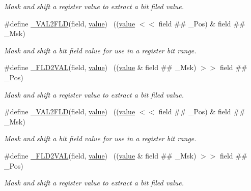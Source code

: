 \begin{DoxyCompactItemize}
\begin{DoxyCompactList}\small\item\em Mask and shift a register value to extract a bit filed value. \end{DoxyCompactList}\item 
\#define \hyperlink{group___c_m_s_i_s__core__bitfield_ga6d42abc96f2b99932a82deb035bd6935}{\+\_\+\+V\+A\+L2\+F\+LD}(field,  \hyperlink{semihosting_8h_aacce635d68067370c70caa2381ea1040}{value})    ~((\hyperlink{semihosting_8h_aacce635d68067370c70caa2381ea1040}{value} $<$$<$ field \#\# \+\_\+\+Pos) \& field \#\# \+\_\+\+Msk)
\begin{DoxyCompactList}\small\item\em Mask and shift a bit field value for use in a register bit range. \end{DoxyCompactList}\item 
\#define \hyperlink{group___c_m_s_i_s__core__bitfield_ga7c1d2cae011acffd9401d0096f938cd7}{\+\_\+\+F\+L\+D2\+V\+AL}(field,  \hyperlink{semihosting_8h_aacce635d68067370c70caa2381ea1040}{value})    ~((\hyperlink{semihosting_8h_aacce635d68067370c70caa2381ea1040}{value} \& field \#\# \+\_\+\+Msk) $>$$>$ field \#\# \+\_\+\+Pos)
\begin{DoxyCompactList}\small\item\em Mask and shift a register value to extract a bit filed value. \end{DoxyCompactList}\item 
\#define \hyperlink{group___c_m_s_i_s__core__bitfield_ga6d42abc96f2b99932a82deb035bd6935}{\+\_\+\+V\+A\+L2\+F\+LD}(field,  \hyperlink{semihosting_8h_aacce635d68067370c70caa2381ea1040}{value})    ~((\hyperlink{semihosting_8h_aacce635d68067370c70caa2381ea1040}{value} $<$$<$ field \#\# \+\_\+\+Pos) \& field \#\# \+\_\+\+Msk)
\begin{DoxyCompactList}\small\item\em Mask and shift a bit field value for use in a register bit range. \end{DoxyCompactList}\item 
\#define \hyperlink{group___c_m_s_i_s__core__bitfield_ga7c1d2cae011acffd9401d0096f938cd7}{\+\_\+\+F\+L\+D2\+V\+AL}(field,  \hyperlink{semihosting_8h_aacce635d68067370c70caa2381ea1040}{value})    ~((\hyperlink{semihosting_8h_aacce635d68067370c70caa2381ea1040}{value} \& field \#\# \+\_\+\+Msk) $>$$>$ field \#\# \+\_\+\+Pos)
\begin{DoxyCompactList}\small\item\em Mask and shift a register value to extract a bit filed value. \end{DoxyCompactList}\item 

\end{DoxyCompactItemize}
